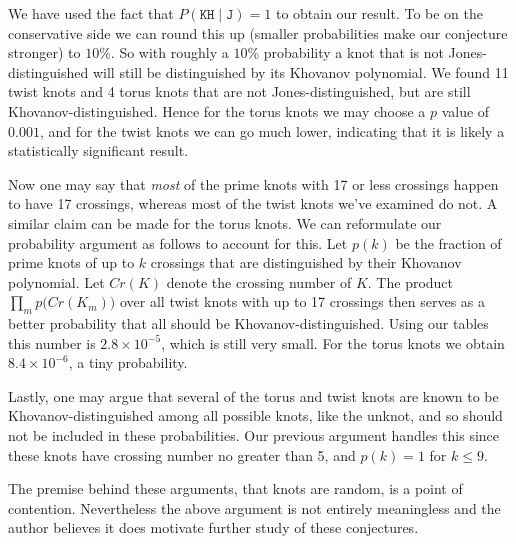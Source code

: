     We have used the fact that $P(\texttt{KH}\;|\;\texttt{J})=1$ to obtain our
    result.
    To be on the conservative side we can round this up (smaller probabilities
    make our conjecture stronger) to $10\%$. So with roughly a $10\%$
    probability a knot that is not Jones-distinguished will still be
    distinguished by its Khovanov polynomial. We found 11 twist knots and 4
    torus knots that are not Jones-distinguished, but are still
    Khovanov-distinguished. Hence for the torus knots we may choose a $p$
    value of $0.001$, and for the twist knots we can go much lower, indicating
    that it is likely a statistically significant result.
    \par\hfill\par
    Now one may say that \textit{most} of the prime knots with 17 or less
    crossings happen to have 17 crossings, whereas most of the twist knots
    we've examined do not.
    A similar claim can be made for the torus knots. We can reformulate
    our probability argument as follows to account for this. Let
    $p(k)$ be the fraction of prime knots of up to $k$ crossings that are
    distinguished by their Khovanov polynomial. Let
    $Cr(K)$ denote the crossing number of $K$. The product
    $\prod_{m}p\big(Cr(K_{m})\big)$ over all twist knots with up to 17 crossings
    then serves as a better probability that all should be
    Khovanov-distinguished. Using our tables this number is
    $2.8\times{10}^{-5}$, which is still very small. For the torus
    knots we obtain $8.4\times{10}^{-6}$, a tiny probability.
    \par\hfill\par
    Lastly, one may argue that several of the torus and twist knots are known
    to be Khovanov-distinguished among all possible knots, like the unknot,
    and so should not be included in these probabilities.
    Our previous argument handles this since these knots have
    crossing number no greater than 5, and $p(k)=1$ for $k\leq{9}$.
    \par\hfill\par
    The premise behind these arguments, that knots are random, is a point of
    contention. Nevertheless the above argument is not entirely meaningless
    and the author believes it does motivate further study of these conjectures.
